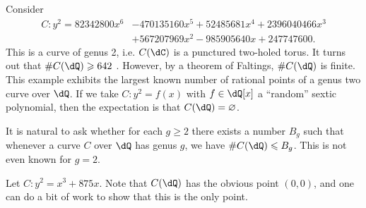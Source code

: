\documentclass{article}
\begin{document}
\begin{example}[Stoll]
Consider 
\begin{align*}
  C : y^2 = 82342800 x^6 &- 470135160 x^5 + 52485681 x^4 + 2396040466 x^3 \\
    &+ 567207969 x^2 - 985905640 x + 247747600 \text{.}
\end{align*}
This is a curve of genus 2, i.e. $C(\dC)$ is a punctured two-holed 
torus. It turns out that $\# C(\dQ)\geqslant 642$ \cite[\S 6]{st09}. 
However, by a theorem of Faltings, $\# C(\dQ)$ is finite. This example exhibits 
the largest known number of rational points of a genus two curve 
over $\dQ$. If we take $C:y^2=f(x)$ with $f\in\dQ[x]$ a 
``random'' sextic polynomial, then the expectation is that 
$C(\dQ)=\varnothing$. 
\end{example}

It is natural to ask whether for each $g\geqslant 2$ there exists a number 
$B_g$ such that whenever a curve $C$ over $\dQ$ has genus $g$, we have 
$\# C(\dQ)\leqslant B_g$. This is not even known for $g=2$. 

\begin{example}
Let $C:y^2=x^3+875 x$. Note that $C(\dQ)$ has the obvious point 
$(0,0)$, and one can do a bit of work to show that this is the only point. 
\end{example}
\end{document}

